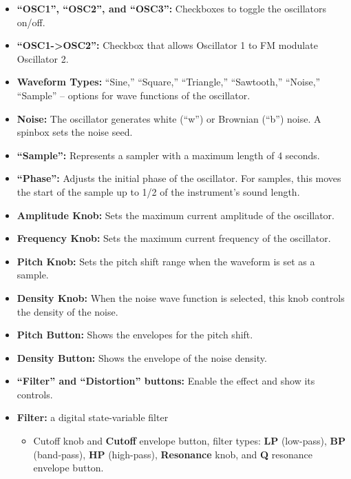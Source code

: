 \documentclass[11pt]{article}
\providecommand{\tightlist}{%
  \setlength{\itemsep}{0pt}\setlength{\parskip}{0pt}}
\begin{document}
\begin{itemize}
\tightlist
\item
  \textbf{``OSC1'', ``OSC2'', and ``OSC3'':} Checkboxes to toggle the
  oscillators on/off.
\item
  \textbf{``OSC1-\textgreater OSC2'':} Checkbox that allows Oscillator 1
  to FM modulate Oscillator 2.
\item
  \textbf{Waveform Types:} ``Sine,'' ``Square,'' ``Triangle,''
  ``Sawtooth,'' ``Noise,'' ``Sample'' -- options for wave functions of
  the oscillator.
\item
  \textbf{Noise:} The oscillator generates white (``w'') or Brownian
  (``b'') noise. A spinbox sets the noise seed.
\item
  \textbf{``Sample'':} Represents a sampler with a maximum length of 4
  seconds.
\item
  \textbf{``Phase'':} Adjusts the initial phase of the oscillator. For
  samples, this moves the start of the sample up to 1/2 of the
  instrument's sound length.
\item
  \textbf{Amplitude Knob:} Sets the maximum current amplitude of the
  oscillator.
\item
  \textbf{Frequency Knob:} Sets the maximum current frequency of the
  oscillator.
\item
  \textbf{Pitch Knob:} Sets the pitch shift range when the waveform is
  set as a sample.
\item
  \textbf{Density Knob:} When the noise wave function is selected, this
  knob controls the density of the noise.
\item
  \textbf{Pitch Button:} Shows the envelopes for the pitch shift.
\item
  \textbf{Density Button:} Shows the envelope of the noise density.
\item
  \textbf{``Filter'' and ``Distortion'' buttons:} Enable the effect and
  show its controls.
\item
  \textbf{Filter:} a digital state-variable filter

  \begin{itemize}
  \tightlist
  \item
    Cutoff knob and \textbf{Cutoff} envelope button, filter types:
    \textbf{LP} (low-pass), \textbf{BP} (band-pass), \textbf{HP}
    (high-pass), \textbf{Resonance} knob, and \textbf{Q} resonance
    envelope button.
  \end{itemize}
\end{itemize}
\end{document}
